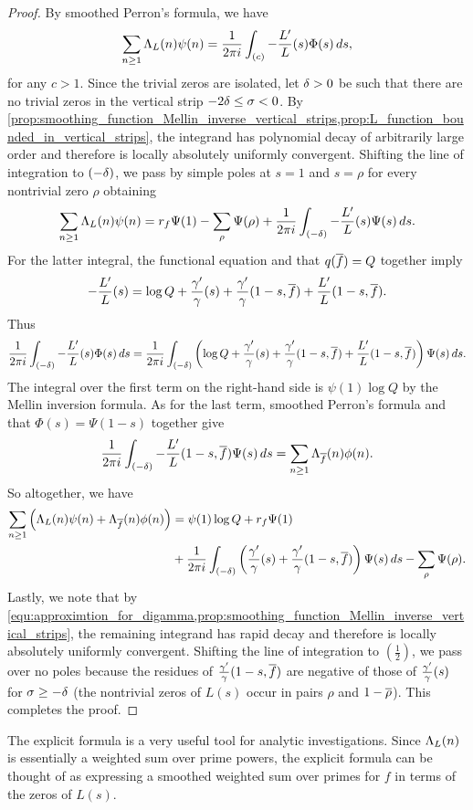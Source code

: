 \documentclass[12pt]{article}
\begin{document}
    \begin{proof}
      By smoothed Perron's formula, we have
      \[
        \sum_{n \ge 1}\Lambda_{L}(n)\psi(n) = \frac{1}{2\pi i}\int_{(c)}-\frac{L'}{L}(s)\Phi(s)\,ds,
      \]
      for any \(c > 1\). Since the trivial zeros are isolated, let \(\delta > 0\) be such that there are no trivial zeros in the vertical strip \(-2\delta \le \sigma < 0\). By \cref{prop:smoothing_function_Mellin_inverse_vertical_strips,prop:L_function_bounded_in_vertical_strips}, the integrand has polynomial decay of arbitrarily large order and therefore is locally absolutely uniformly convergent. Shifting the line of integration to \((-\delta)\), we pass by simple poles at \(s = 1\) and \(s = \rho\) for every nontrivial zero \(\rho\) obtaining
      \[
        \sum_{n \ge 1}\Lambda_{L}(n)\psi(n) = r_{f}\Psi(1)-\sum_{\rho}\Psi(\rho)+\frac{1}{2\pi i}\int_{(-\delta)}-\frac{L'}{L}(s)\Psi(s)\,ds.
      \]
      For the latter integral, the functional equation and that \(q(\overline{f}) = Q\) together imply
      \[
        -\frac{L'}{L}(s) = \log{Q}+\frac{\gamma'}{\gamma}(s)+\frac{\gamma'}{\gamma}(1-s,\overline{f})+\frac{L'}{L}(1-s,\overline{f}).
      \]
      Thus
      \[
        \frac{1}{2\pi i}\int_{(-\delta)}-\frac{L'}{L}(s)\Phi(s)\,ds = \frac{1}{2\pi i}\int_{(-\delta)}\left(\log{Q}+\frac{\gamma'}{\gamma}(s)+\frac{\gamma'}{\gamma}(1-s,\overline{f})+\frac{L'}{L}(1-s,\overline{f})\right)\Psi(s)\,ds.
      \]
      The integral over the first term on the right-hand side is \(\psi(1)\log{Q}\) by the Mellin inversion formula. As for the last term, smoothed Perron's formula and that \(\Phi(s) = \Psi(1-s)\) together give
      \[
        \frac{1}{2\pi i}\int_{(-\delta)}-\frac{L'}{L}(1-s,\overline{f})\Psi(s)\,ds = \sum_{n \ge 1}\Lambda_{\overline{f}}(n)\phi(n).
      \]
      So altogether, we have
      \begin{align*}
        \sum_{n \ge 1}\left(\Lambda_{L}(n)\psi(n)+\Lambda_{\overline{f}}(n)\phi(n)\right) &= \psi(1)\log{Q}+r_{f}\Psi(1) \\
        &+ \frac{1}{2\pi i}\int_{(-\delta)}\left(\frac{\gamma'}{\gamma}(s)+\frac{\gamma'}{\gamma}(1-s,\overline{f})\right)\Psi(s)\,ds-\sum_{\rho}\Psi(\rho).
      \end{align*}
      Lastly, we note that by \cref{equ:approximtion_for_digamma,prop:smoothing_function_Mellin_inverse_vertical_strips}, the remaining integrand has rapid decay and therefore is locally absolutely uniformly convergent. Shifting the line of integration to \(\left(\frac{1}{2}\right)\), we pass over no poles because the residues of \(\frac{\gamma'}{\gamma}(1-s,\overline{f})\) are negative of those of \(\frac{\gamma'}{\gamma}(s)\) for \(\sigma \ge -\delta\) (the nontrivial zeros of \(L(s)\) occur in pairs \(\rho\) and \(1-\overline{\rho}\)). This completes the proof. 
    \end{proof}

    The explicit formula is a very useful tool for analytic investigations. Since \(\Lambda_{L}(n)\) is essentially a weighted sum over prime powers, the explicit formula can be thought of as expressing a smoothed weighted sum over primes for \(f\) in terms of the zeros of \(L(s)\).
\fi



\end{document}
